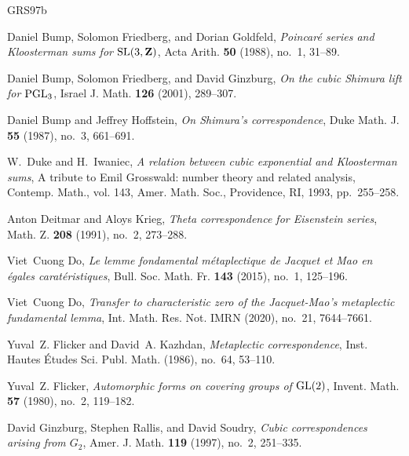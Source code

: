 \documentclass[12pt]{amsart}
\theoremstyle{remark}
\begin{document}
\begin{thebibliography}{GRS97b}

Daniel Bump, Solomon Friedberg, and Dorian Goldfeld, \emph{Poincar\'e series
  and {K}loosterman sums for {${\rm SL}(3,{\bf Z})$}}, Acta Arith. \textbf{50}
  (1988), no.~1, 31--89. 

Daniel Bump, Solomon Friedberg, and David Ginzburg, \emph{On the cubic
  {S}himura lift for {${\rm PGL}_3$}}, Israel J. Math. \textbf{126} (2001),
  289--307. 

Daniel Bump and Jeffrey Hoffstein, \emph{On {S}himura's correspondence}, Duke
  Math. J. \textbf{55} (1987), no.~3, 661--691. 

W.~Duke and H.~Iwaniec, \emph{A relation between cubic exponential and
  {K}loosterman sums}, A tribute to {E}mil {G}rosswald: number theory and
  related analysis, Contemp. Math., vol. 143, Amer. Math. Soc., Providence, RI,
  1993, pp.~255--258. 

Anton Deitmar and Aloys Krieg, \emph{Theta correspondence for {E}isenstein
  series}, Math. Z. \textbf{208} (1991), no.~2, 273--288. 
  
Viet~Cuong Do, \emph{Le lemme fondamental m\'etaplectique de Jacquet et Mao en \'egales 
carat\'eristiques}, Bull. Soc. Math. Fr. \textbf{143} (2015), no.~1, 125--196.

Viet~Cuong Do, \emph{Transfer to characteristic zero of the {J}acquet-{M}ao's
  metaplectic fundamental lemma}, Int. Math. Res. Not. IMRN (2020), no.~21,
  7644--7661. 

Yuval~Z. Flicker and David~A. Kazhdan, \emph{Metaplectic correspondence}, Inst.
  Hautes \'Etudes Sci. Publ. Math. (1986), no.~64, 53--110. 

Yuval~Z. Flicker, \emph{Automorphic forms on covering groups of {${\rm
  GL}(2)$}}, Invent. Math. \textbf{57} (1980), no.~2, 119--182. 

David Ginzburg, Stephen Rallis, and David Soudry, \emph{Cubic correspondences
  arising from {$G_2$}}, Amer. J. Math. \textbf{119} (1997), no.~2, 251--335.


\end{thebibliography}
\end{document}
